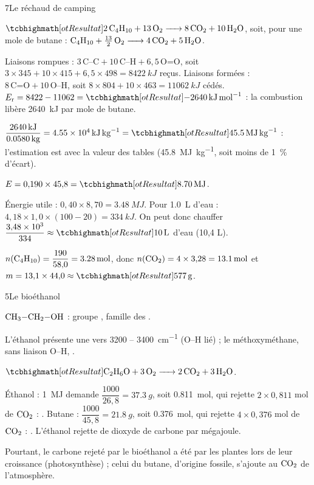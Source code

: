 \begin{corrigeBac}{7}{Le réchaud de camping}
\begin{questions}
\item $\res{\ce{2 C4H10 + 13 O2 -> 8 CO2 + 10 H2O}}$, soit, pour une mole de butane : $\ce{C4H10 + 13/2 O2 -> 4 CO2 + 5 H2O}$. \pts{1 pt}
\item Liaisons rompues : $3\,\text{C--C}+10\,\text{C--H}+6{,}5\,\text{O=O}$, soit $3\times345+10\times415+6{,}5\times498=\qty{8422}{kJ}$ reçus. Liaisons formées :
$8\,\text{C=O}+10\,\text{O--H}$, soit $8\times804+10\times463=\qty{11062}{kJ}$ cédés. $E_\mathrm{r}=8422-11062=\res{\qty{-2640}{kJ.mol^{-1}}}$ : la
combustion libère \qty{2640}{kJ} par mole de butane. 
\item $\dfrac{\qty{2640}{kJ}}{\qty{0,0580}{kg}}=\qty{4,55e4}{kJ.kg^{-1}}=\res{\qty{45,5}{MJ.kg^{-1}}}$ : l'estimation est  avec la valeur des
tables (\qty{45,8}{MJ.kg^{-1}}, soit moins de \qty{1}{\percent} d'écart). \pts{1 pt}
\item $E=0{,}190\times45{,}8=\res{\qty{8,70}{MJ}}$. \pts{1 pt}
\item Énergie utile : $0{,}40\times8{,}70=\qty{3,48}{MJ}$. Pour \qty{1,0}{L} d'eau : $4{,}18\times1{,}0\times(100-20)=\qty{334}{kJ}$. On peut donc chauffer
$\dfrac{3{,}48\times10^{3}}{334}\approx\res{\qty{10}{L}}$ d'eau (10,4 L). 
\item $n(\ce{C4H10})=\dfrac{190}{58{,}0}=\qty{3,28}{mol}$, donc $n(\ce{CO2})=4\times3{,}28=\qty{13,1}{mol}$ et $m=13{,}1\times44{,}0\approx\res{\qty{577}{g}}$. 
\end{questions}
\end{corrigeBac}

\begin{corrigeBac}{5}{Le bioéthanol}
\begin{questions}
\item $\ce{CH3-CH2-OH}$ : groupe , famille des . \pts{1 pt}
\item L'éthanol présente une  vers 3200 -- \qty{3400}{cm^{-1}} (O--H lié) ; le méthoxyméthane, sans liaison O--H,
. \pts{1 pt}
\item $\res{\ce{C2H6O + 3 O2 -> 2 CO2 + 3 H2O}}$. \pts{1 pt}
\item Éthanol : \qty{1}{MJ} demande $\dfrac{1000}{26{,}8}=\qty{37,3}{g}$, soit \qty{0,811}{mol}, qui rejette $2\times0{,}811$ mol de $\ce{CO2}$ : . Butane :
$\dfrac{1000}{45{,}8}=\qty{21,8}{g}$, soit \qty{0,376}{mol}, qui rejette $4\times0{,}376$ mol de $\ce{CO2}$ : . L'éthanol rejette
 de dioxyde de carbone par mégajoule. 
\item Pourtant, le carbone rejeté par le bioéthanol a été  par les plantes lors de leur croissance
(photosynthèse) ; celui du butane, d'origine fossile, s'ajoute au $\ce{CO2}$ de l'atmosphère. 
\end{questions}
\end{corrigeBac}
